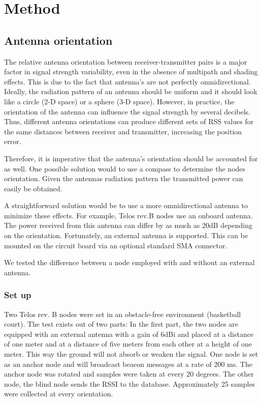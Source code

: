 \section{Method}
\subsection{Antenna orientation}
The relative antenna orientation between receiver-transmitter pairs is a major factor in signal strength variability, even in the absence of multipath and shading effects\cite{lymberopoulos2006ecr}. This is due to the fact that antenna's are not perfectly omnidirectional. Ideally, the radiation pattern of an antenna should be uniform and it should look like a circle (2-D space) or a sphere (3-D space). However, in practice, the orientation of the antenna can influence the signal strength by several decibels. Thus, different antenna orientations can produce different sets of RSS values for the same distances between receiver and transmitter, increasing the position error.

Therefore, it is imperative that the antenna's orientation should be accounted for as well. One possible solution would to use a compass to determine the nodes orientation. Given the antennas radiation pattern the transmitted power can easily be obtained. 

A straightforward solution would be to use a more omnidirectional antenna to minimize these effects. For example, Telos rev.B nodes use an onboard antenna. The power received from this antenna can differ by as much as 20dB depending on the orientation.  Fortunately, an external antenna is supported. This can be mounted on the circuit board via an optional standard SMA connector. 

We tested the difference between a node employed with and without an external antenna.

\subsubsection{Set up}
Two Telos rev. B nodes were set in an obstacle-free environment (basketball court). 
The test exists out of two parts:
In the first part, the two nodes are equipped with an external antenna with a gain of 6dBi and placed at a distance of one meter and at a distance of five meters from each other at a height of one meter. This way the ground will not absorb or weaken the signal. One node is set as an anchor node and will broadcast beacon messages at a rate of 200 ms. The anchor node was rotated and samples were taken at every 20 degrees. The other node, the blind node sends the RSSI to the database. Approximately 25 samples were collected at every orientation.

